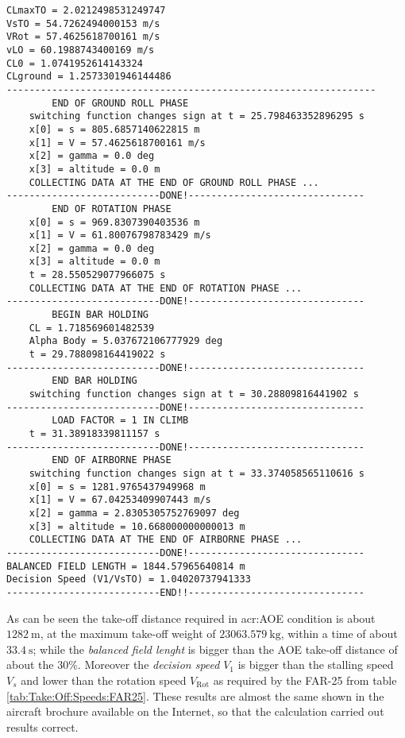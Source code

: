 \bigskip
\begin{lstlisting}[caption={ATR-72 test results}, captionpos=b, tabsize=2]
CLmaxTO = 2.0212498531249747
VsTO = 54.7262494000153 m/s
VRot = 57.4625618700161 m/s
vLO = 60.1988743400169 m/s
CL0 = 1.0741952614143324
CLground = 1.2573301946144486
-----------------------------------------------------------------
		END OF GROUND ROLL PHASE
	switching function changes sign at t = 25.798463352896295 s
	x[0] = s = 805.6857140622815 m
	x[1] = V = 57.4625618700161 m/s
	x[2] = gamma = 0.0 deg
	x[3] = altitude = 0.0 m
	COLLECTING DATA AT THE END OF GROUND ROLL PHASE ...
---------------------------DONE!-------------------------------
		END OF ROTATION PHASE
	x[0] = s = 969.8307390403536 m
	x[1] = V = 61.80076798783429 m/s
	x[2] = gamma = 0.0 deg
	x[3] = altitude = 0.0 m
	t = 28.550529077966075 s
	COLLECTING DATA AT THE END OF ROTATION PHASE ...
---------------------------DONE!-------------------------------
		BEGIN BAR HOLDING
	CL = 1.718569601482539
	Alpha Body = 5.037672106777929 deg
	t = 29.788098164419022 s
---------------------------DONE!-------------------------------
		END BAR HOLDING
	switching function changes sign at t = 30.28809816441902 s 
---------------------------DONE!-------------------------------
		LOAD FACTOR = 1 IN CLIMB
	t = 31.38918339811157 s
---------------------------DONE!-------------------------------
		END OF AIRBORNE PHASE
	switching function changes sign at t = 33.374058565110616 s
	x[0] = s = 1281.9765437949968 m
	x[1] = V = 67.04253409907443 m/s
	x[2] = gamma = 2.8305305752769097 deg
	x[3] = altitude = 10.668000000000013 m
	COLLECTING DATA AT THE END OF AIRBORNE PHASE ...
---------------------------DONE!-------------------------------
BALANCED FIELD LENGTH = 1844.57965640814 m
Decision Speed (V1/VsTO) = 1.04020737941333 
---------------------------END!!-------------------------------
\end{lstlisting}
%
As can be seen the take-off distance required in \gls{acr:AOE} condition is about $\SI{1282}{\meter}$, at the maximum take-off weight of $\SI{23063.579}{\kilogram}$, within a time of about $\SI{33.4}{\second}$; while the \emph{balanced field lenght} is bigger than the AOE take-off distance of about the 30\%.  Moreover the \emph{decision speed} $V_1$ is bigger than the stalling speed $V_s$ and lower than the rotation speed $V_{\text{Rot}}$ as required by the \gls{FAR}-25 from table \ref{tab:Take:Off:Speeds:FAR25}.
%
These results are almost the same shown in the aircraft brochure available on the Internet, so that the calculation carried out results correct.
